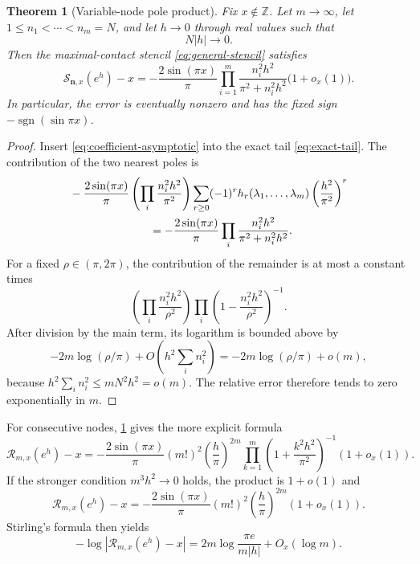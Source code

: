 \documentclass[11pt]{article}
\newtheorem{theorem}{Theorem}[section]
\theoremstyle{definition}
\newcommand{\Z}{\mathbb Z}
\begin{document}
\begin{theorem}[Variable-node pole product]
\label{thm:pole-product}
Fix $x\notin\Z$.  Let $m\to\infty$, let
$1\le n_1<\cdots<n_m=N$, and let $h\to0$ through real values such that
\begin{equation}
 N|h|\longrightarrow0.
 \label{eq:safe-window}
\end{equation}
Then the maximal-contact stencil \eqref{eq:general-stencil} satisfies
\begin{equation}
 \boxed{
 \mathcal S_{\mathbf n,x}(e^h)-x
 =-\frac{2\sin(\pi x)}{\pi}
 \prod_{i=1}^m
 \frac{n_i^2h^2}{\pi^2+n_i^2h^2}
 \bigl(1+o_x(1)\bigr).
 }
 \label{eq:pole-product}
\end{equation}
In particular, the error is eventually nonzero and has the fixed sign
$-\operatorname{sgn}(\sin\pi x)$.
\end{theorem}

\begin{proof}
Insert \eqref{eq:coefficient-asymptotic} into the exact tail
\eqref{eq:exact-tail}.  The contribution of the two nearest poles is
\begin{align*}
 &-\frac{2\sin(\pi x)}{\pi}
 \left(\prod_i\frac{n_i^2h^2}{\pi^2}\right)
 \sum_{r\ge0}(-1)^r
 h_r(\lambda_1,\ldots,\lambda_m)
 \left(\frac{h^2}{\pi^2}\right)^r\\
 &\hspace{25mm}=
 -\frac{2\sin(\pi x)}{\pi}
 \prod_i\frac{n_i^2h^2}{\pi^2+n_i^2h^2}.
\end{align*}
For a fixed $\rho\in(\pi,2\pi)$, the contribution of the remainder is at
most a constant times
\[
 \left(\prod_i\frac{n_i^2h^2}{\rho^2}\right)
 \prod_i\left(1-\frac{n_i^2h^2}{\rho^2}\right)^{-1}.
\]
After division by the main term, its logarithm is bounded above by
\[
 -2m\log(\rho/\pi)+O\!\left(h^2\sum_i n_i^2\right)
 =-2m\log(\rho/\pi)+o(m),
\]
because $h^2\sum_i n_i^2\le mN^2h^2=o(m)$.  The relative error therefore
tends to zero exponentially in $m$.
\end{proof}

For consecutive nodes, \cref{thm:pole-product} gives the more explicit formula
\begin{equation}
 \mathcal R_{m,x}(e^h)-x
 =-\frac{2\sin(\pi x)}{\pi}
 (m!)^2\left(\frac{h}{\pi}\right)^{2m}
 \prod_{k=1}^m\left(1+\frac{k^2h^2}{\pi^2}\right)^{-1}
 (1+o_x(1)).
 \label{eq:richardson-product}
\end{equation}
If the stronger condition $m^3h^2\to0$ holds, the product is $1+o(1)$ and
\begin{equation}
 \mathcal R_{m,x}(e^h)-x
 =-\frac{2\sin(\pi x)}{\pi}
 (m!)^2\left(\frac{h}{\pi}\right)^{2m}(1+o_x(1)).
 \label{eq:richardson-simple-asymptotic}
\end{equation}
Stirling's formula then yields
\begin{equation}
 -\log|\mathcal R_{m,x}(e^h)-x|
 =2m\log\frac{\pi e}{m|h|}+O_x(\log m).
 \label{eq:richardson-log-error}
\end{equation}
\end{document}
